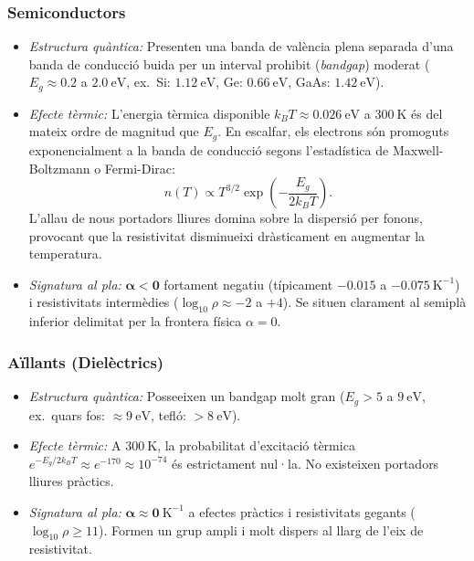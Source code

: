 \documentclass[a4paper,11pt]{article}
\begin{document}
\subsubsection{Semiconductors}
\label{sec:semiconductors}
\begin{itemize}
    \item \emph{Estructura quàntica:} Presenten una banda de valència plena separada d'una banda de conducció buida per un interval prohibit (\emph{bandgap}) moderat ($E_g \approx 0.2$ a $2.0\ \text{eV}$, ex.\ Si: $1.12\ \text{eV}$, Ge: $0.66\ \text{eV}$, GaAs: $1.42\ \text{eV}$).
    \item \emph{Efecte tèrmic:} L'energia tèrmica disponible $k_B T \approx 0.026\ \text{eV}$ a $300\ \text{K}$ és del mateix ordre de magnitud que $E_g$. En escalfar, els electrons són promoguts exponencialment a la banda de conducció segons l'estadística de Maxwell-Boltzmann o Fermi-Dirac:
    \begin{equation}
        n(T) \propto T^{3/2} \exp\left(-\frac{E_g}{2 k_B T}\right).
    \end{equation}
    L'allau de nous portadors lliures domina sobre la dispersió per fonons, provocant que la resistivitat disminueixi dràsticament en augmentar la temperatura.
    \item \emph{Signatura al pla:} $\mathbf{\alpha < 0}$ fortament negatiu (típicament $-0.015$ a $-0.075\ \text{K}^{-1}$) i resistivitats intermèdies ($\log_{10}\rho \approx -2$ a $+4$). Se situen clarament al semiplà inferior delimitat per la frontera física $\alpha = 0$.
\end{itemize}

\subsubsection{Aïllants (Dielèctrics)}
\label{sec:aillants}
\begin{itemize}
    \item \emph{Estructura quàntica:} Posseeixen un bandgap molt gran ($E_g > 5$ a $9\ \text{eV}$, ex.\ quars fos: $\approx 9\ \text{eV}$, tefló: $> 8\ \text{eV}$).
    \item \emph{Efecte tèrmic:} A $300\ \text{K}$, la probabilitat d'excitació tèrmica $e^{-E_g / 2k_BT} \approx e^{-170} \approx 10^{-74}$ és estrictament nul·la. No existeixen portadors lliures pràctics.
    \item \emph{Signatura al pla:} $\mathbf{\alpha \approx 0}\ \text{K}^{-1}$ a efectes pràctics i resistivitats gegants ($\log_{10}\rho \ge 11$). Formen un grup ampli i molt dispers al llarg de l'eix de resistivitat.
\end{itemize}
\end{document}
